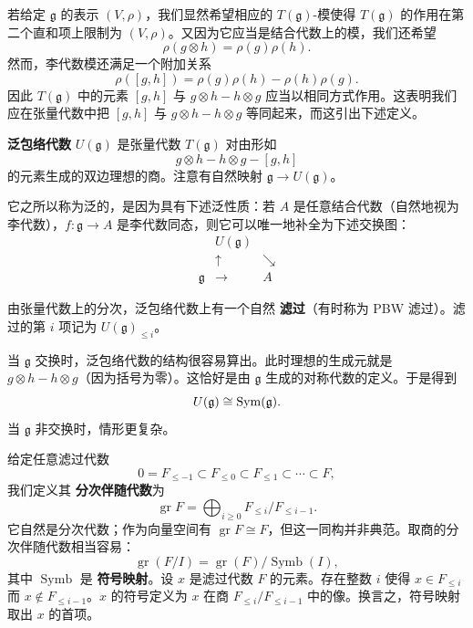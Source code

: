 若给定 $\mathfrak g$ 的表示 $(V,\rho)$，我们显然希望相应的 $T(\mathfrak g)$-模使得 $T(\mathfrak g)$ 的作用在第二个直和项上限制为 $(V,\rho)$。又因为它应当是结合代数上的模，我们还希望
\[
    \rho(g\otimes h)=\rho(g)\rho(h).
\]
然而，李代数模还满足一个附加关系
\[
    \rho([g,h])=\rho(g)\rho(h)-\rho(h)\rho(g).
\]
因此 $T(\mathfrak g)$ 中的元素 $[g,h]$ 与 $g\otimes h-h\otimes g$ 应当以相同方式作用。这表明我们应在张量代数中把 $[g,h]$ 与 $g\otimes h-h\otimes g$ 等同起来，而这引出下述定义。



\textbf{泛包络代数} $U(\mathfrak g)$ 是张量代数 $T(\mathfrak g)$ 对由形如
\[
    g\otimes h-h\otimes g-[g,h]
\]
的元素生成的双边理想的商。注意有自然映射 $\mathfrak g\to U(\mathfrak g)$。

它之所以称为泛的，是因为具有下述泛性质：若 $A$ 是任意结合代数（自然地视为李代数），$f:\mathfrak g\to A$ 是李代数同态，则它可以唯一地补全为下述交换图：
\[
    \begin{array}{ccc}
         & U(\mathfrak g) & \\[-4pt]
         & \uparrow & \searrow \\[-4pt]
        \mathfrak g & \longrightarrow & A
    \end{array}
\]

由张量代数上的分次，泛包络代数上有一个自然 \textbf{滤过}（有时称为 PBW 滤过）。滤过的第 $i$ 项记为 $U(\mathfrak g)_{\le i}$。

当 $\mathfrak g$ 交换时，泛包络代数的结构很容易算出。此时理想的生成元就是 $g\otimes h-h\otimes g$（因为括号为零）。这恰好是由 $\mathfrak g$ 生成的对称代数的定义。于是得到
\[
    U(\mathfrak g)\cong\operatorname{Sym}(\mathfrak g).
\]
当 $\mathfrak g$ 非交换时，情形更复杂。

给定任意滤过代数
\[
    0=F_{\le-1}\subset F_{\le0}\subset F_{\le1}\subset\cdots\subset F,
\]
我们定义其 \textbf{分次伴随代数}为
\[
    \operatorname{gr}F=\bigoplus_{i\ge0}F_{\le i}/F_{\le i-1}.
\]
它自然是分次代数；作为向量空间有 $\operatorname{gr}F\cong F$，但这一同构并非典范。取商的分次伴随代数相当容易：
\[
    \operatorname{gr}(F/I)=\operatorname{gr}(F)/\operatorname{Symb}(I),
\]
其中 $\operatorname{Symb}$ 是 \textbf{符号映射}。设 $x$ 是滤过代数 $F$ 的元素。存在整数 $i$ 使得 $x\in F_{\le i}$ 而 $x\notin F_{\le i-1}$。$x$ 的符号定义为 $x$ 在商 $F_{\le i}/F_{\le i-1}$ 中的像。换言之，符号映射取出 $x$ 的首项。

